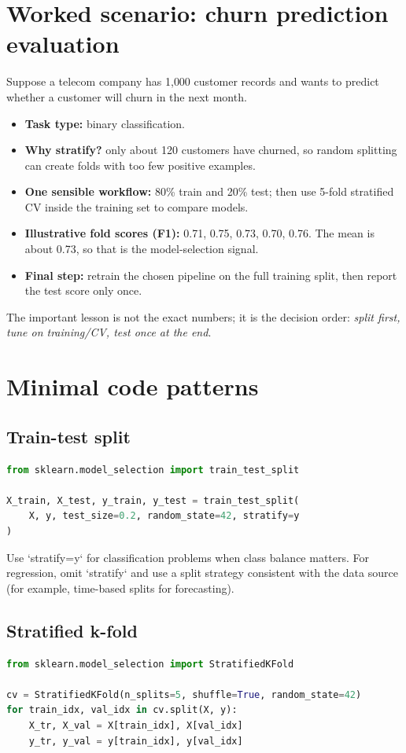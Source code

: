 \documentclass[11pt]{article}
\begin{document}
\section{Worked scenario: churn prediction evaluation}
Suppose a telecom company has 1{,}000 customer records and wants to predict whether a customer will churn in the next month.
\begin{itemize}[leftmargin=*]
  \item \textbf{Task type:} binary classification.
  \item \textbf{Why stratify?} only about 120 customers have churned, so random splitting can create folds with too few positive examples.
  \item \textbf{One sensible workflow:} 80\% train and 20\% test; then use 5-fold stratified CV inside the training set to compare models.
  \item \textbf{Illustrative fold scores (F1):} 0.71, 0.75, 0.73, 0.70, 0.76. The mean is about 0.73, so that is the model-selection signal.
  \item \textbf{Final step:} retrain the chosen pipeline on the full training split, then report the test score only once.
\end{itemize}
The important lesson is not the exact numbers; it is the decision order: \emph{split first, tune on training/CV, test once at the end}.

\section{Minimal code patterns}
\subsection{Train-test split}
\begin{lstlisting}[language=Python]
from sklearn.model_selection import train_test_split

X_train, X_test, y_train, y_test = train_test_split(
    X, y, test_size=0.2, random_state=42, stratify=y
)
\end{lstlisting}
Use `stratify=y` for classification problems when class balance matters. For regression, omit `stratify` and use a split strategy consistent with the data source (for example, time-based splits for forecasting).

\subsection{Stratified k-fold}
\begin{lstlisting}[language=Python]
from sklearn.model_selection import StratifiedKFold

cv = StratifiedKFold(n_splits=5, shuffle=True, random_state=42)
for train_idx, val_idx in cv.split(X, y):
    X_tr, X_val = X[train_idx], X[val_idx]
    y_tr, y_val = y[train_idx], y[val_idx]
\end{lstlisting}
\end{document}
